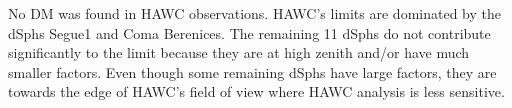No DM was found in HAWC observations.
HAWC's limits are dominated by the dSphs Segue1 and Coma Berenices.
The remaining 11 dSphs do not contribute significantly to the limit because they are at high zenith and/or have much smaller \J factors.
Even though some remaining dSphs have large \J factors, they are towards the edge of HAWC's field of view where HAWC analysis is less sensitive.

\begin{figure}[h]
\end{figure}
